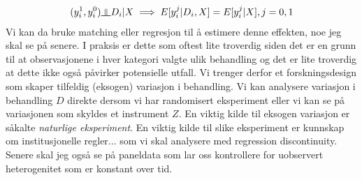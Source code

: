 \begin{align}
(y_i^1,y_i^0) \indep D_i|X \implies E[y_i^j|D_i,X]=E[y_i^j|X], j=0,1
\end{align}
Vi kan da bruke matching eller regresjon til å estimere denne effekten, noe jeg skal se på senere. I praksis er dette som oftest lite troverdig siden det er en grunn til at observasjonene i hver kategori valgte ulik behandling og det er lite troverdig at dette ikke også påvirker potensielle utfall. Vi trenger derfor et forskningsdesign som skaper tilfeldig (eksogen) variasjon i behandling. Vi kan analysere variasjon i behandling $D$ direkte dersom vi har randomisert eksperiment eller vi kan se på variasjonen som skyldes et instrument $Z$. En viktig kilde til eksogen variasjon er såkalte \textit{naturlige eksperiment}. En viktig kilde til slike eksperiment er kunnskap om institusjonelle regler... som vi skal analysere med regression discontinuity. Senere skal jeg også se på paneldata som lar oss kontrollere for uobservert heterogenitet som er konstant over tid.
